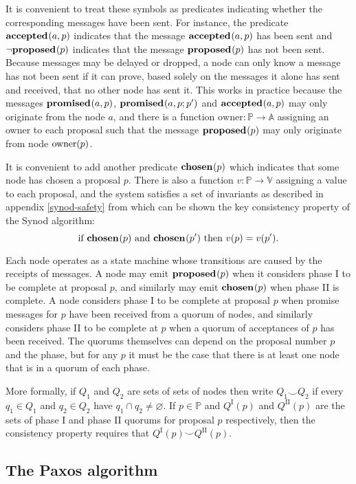 \documentclass[journal]{IEEEtran}
\begin{document}
It is convenient to treat these symbols as predicates indicating whether the
corresponding messages have been sent. For instance, the predicate
$\mathbf{accepted}_{}(a,p)$ indicates that the message $\mathbf{accepted}_{}(a,p)$ has been sent and
$\neg \mathbf{proposed}_{}(p)$ indicates that the message $\mathbf{proposed}_{}(p)$ has not been sent.
Because messages may be delayed or dropped, a node can only know a message has
not been sent if it can prove, based solely on the messages it alone has sent
and received, that no other node has sent it. This works in practice because
the messages $\mathbf{promised}_{}(a,p)$, $\mathbf{promised}_{}(a,p;p')$ and $\mathbf{accepted}_{}(a,p)$ may only
originate from the node $a$, and there is a function $\mathrm{owner} : \mathbb
P \to \mathbb A$ assigning an owner to each proposal such that the message
$\mathbf{proposed}_{}(p)$ may only originate from node $\mathrm{owner}(p)$.

It is convenient to add another predicate $\mathbf{chosen}_{}(p)$ which indicates that
some node has chosen a proposal $p$. There is also a function $v : \mathbb P
\to \mathbb V$ assigning a value to each proposal, and the system satisfies a
set of invariants as described in appendix \ref{synod-safety} from which can be
shown the key consistency property of the Synod algorithm: \[\textrm{if }
\mathbf{chosen}_{}(p) \textrm{ and } \mathbf{chosen}_{}(p') \textrm { then } v(p) = v(p').\]

Each node operates as a state machine whose transitions are caused by the
receipts of messages. A node may emit $\mathbf{proposed}_{}(p)$ when it considers phase I to
be complete at proposal $p$, and similarly may emit $\mathbf{chosen}_{}(p)$ when phase
II is complete.  A node considers phase I to be complete at proposal $p$ when
promise messages for $p$ have been received from a quorum of nodes, and
similarly considers phase II to be complete at $p$ when a quorum of acceptances
of $p$ has been received. The quorums themselves can depend on the proposal
number $p$ and the phase, but for any $p$ it must be the case that there is at
least one node that is in a quorum of each phase.

More formally, if $Q_1$ and $Q_2$ are sets of sets of nodes then write $Q_1
\smile Q_2$ if every $q_1 \in Q_1$ and $q_2 \in Q_2$ have $q_1 \cap q_2 \ne
\varnothing$.  If $p \in \mathbb P$ and $Q^\textrm{I}(p)$ and
$Q^\textrm{II}(p)$ are the sets of phase I and phase II quorums for proposal
$p$ respectively, then the consistency property requires that $Q^\textrm{I}(p)
\smile Q^\textrm{II}(p)$.

\subsection{The Paxos algorithm}
\end{document}
